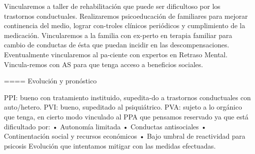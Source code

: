 \documentclass[encares.tex]{subfiles}
\begin{document}
Vincularemos a taller de rehabilitación que puede ser dificultoso por los trastornos conductuales. Realizaremos psicoeducación de familiares para mejorar continencia del medio, lograr con-troles clínicos periódicos y cumplimiento de la medicación. Vincularemos a la familia con ex-perto en terapia familiar para cambio de conductas de ésta que puedan incidir en las descompensaciones. Eventualmente vincularemos al pa-ciente con expertos en Retraso Mental. Vincula-remos con AS para que tenga acceso a beneficios sociales.

==== Evolución y pronóstico

PPI: bueno con tratamiento instituido, supedita-do a trastornos conductuales con auto/hetero. PVI: bueno, supeditado al psiquiátrico. PVA: sujeto a lo orgánico que tenga, en cierto modo vinculado al PPA que pensamos reservado ya que está dificultado por: • Autonomía limitada • Conductas antisociales • Continentación social y recursos económicos • Bajo umbral de reactividad para psicosis Evolución que intentamos mitigar con las medidas efectuadas.
\end{document}

